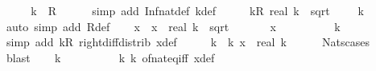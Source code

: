 \begin{isabellebody}
\ \ \isamarkupfalse%
\ \isamarkupfalse%
\ {\isachardoublequoteopen}k\ {\isasymin}\ R{\isachardoublequoteclose}\isanewline
\ \ \ \ \isamarkupfalse%
\ {\isacharparenleft}{\kern0pt}simp\ add{\isacharcolon}{\kern0pt}\ Inf{\isacharunderscore}{\kern0pt}nat{\isacharunderscore}{\kern0pt}def{}\ k{\isacharunderscore}{\kern0pt}def{\isacharparenright}{\kern0pt}\isanewline
\ \ \isamarkupfalse%
\ \isamarkupfalse%
\ kR{\isacharcolon}{\kern0pt}\ {\isachardoublequoteopen}real\ k\ {\isacharasterisk}{\kern0pt}\ sqrt\ {}\ {\isasymin}\ {\isasymnat}{\isachardoublequoteclose}\ \ {\isachardoublequoteopen}k\ {\isachargreater}{\kern0pt}\ {}{\isachardoublequoteclose}\isanewline
\ \ \ \ \isamarkupfalse%
\ {\isacharparenleft}{\kern0pt}auto\ simp\ add{\isacharcolon}{\kern0pt}\ R{\isacharunderscore}{\kern0pt}def{\isacharparenright}{\kern0pt}\isanewline
\ \ \isamarkupfalse%
\ x\ \ {\isachardoublequoteopen}x\ {\isasymequiv}\ real\ k\ {\isacharasterisk}{\kern0pt}\ {\isacharparenleft}{\kern0pt}sqrt\ {}\ {\isacharminus}{\kern0pt}\ {}{\isacharparenright}{\kern0pt}{\isachardoublequoteclose}\isanewline
\ \ \isamarkupfalse%
\ {\isachardoublequoteopen}x\ {\isasymin}\ {\isasymnat}{\isachardoublequoteclose}\isanewline
\ \ \ \ \isamarkupfalse%
\ {\isacartoucheopen}{}\ {\isacharless}{\kern0pt}\ k{\isacartoucheclose}\ \isamarkupfalse%
\ {\isacharparenleft}{\kern0pt}simp\ add{\isacharcolon}{\kern0pt}\ kR\ right{\isacharunderscore}{\kern0pt}diff{\isacharunderscore}{\kern0pt}distrib{\isacharprime}{\kern0pt}\ x{\isacharunderscore}{\kern0pt}def{\isacharparenright}{\kern0pt}\isanewline
\ \ \isamarkupfalse%
\ \isamarkupfalse%
\ k{\isacharprime}{\kern0pt}\ \ k{\isacharprime}{\kern0pt}{\isacharcolon}{\kern0pt}\ {\isachardoublequoteopen}x\ {\isacharequal}{\kern0pt}\ real\ k{\isacharprime}{\kern0pt}{\isachardoublequoteclose}\isanewline
\ \ \ \ \isamarkupfalse%
\ Nats{\isacharunderscore}{\kern0pt}cases\ \isamarkupfalse%
\ blast\isanewline
\ \ \isamarkupfalse%
\ {\isachardoublequoteopen}k{\isacharprime}{\kern0pt}\ {\isachargreater}{\kern0pt}\ {}{\isachardoublequoteclose}\isanewline
\ \ \ \ \isamarkupfalse%
\ {\isacartoucheopen}{}\ {\isacharless}{\kern0pt}\ k{\isacartoucheclose}\ k{\isacharprime}{\kern0pt}\ of{\isacharunderscore}{\kern0pt}nat{\isacharunderscore}{\kern0pt}eq{\isacharunderscore}{\kern0pt}{}{\isacharunderscore}{\kern0pt}iff\ x{\isacharunderscore}{\kern0pt}def\ \isamarkupfalse%

\end{isabellebody}
